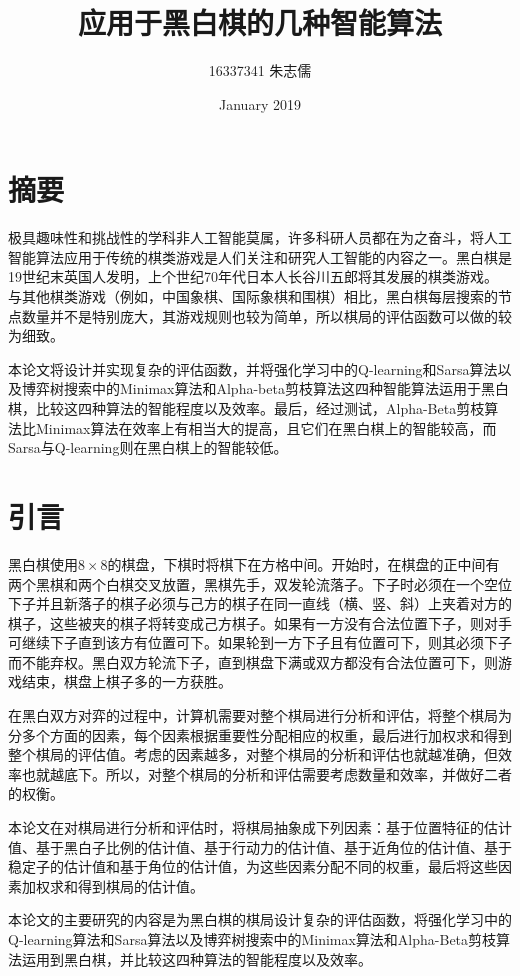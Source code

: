 \documentclass{article}
\title{应用于黑白棋的几种智能算法}
\author{16337341 朱志儒}
\date{January 2019}
\begin{document}
\maketitle

\section{摘要}
极具趣味性和挑战性的学科非人工智能莫属，许多科研人员都在为之奋斗，将人工智能算法应用于传统的棋类游戏是人们关注和研究人工智能的内容之一。黑白棋\cite{r3}是19世纪末英国人发明，上个世纪70年代日本人长谷川五郎将其发展的棋类游戏。
与其他棋类游戏（例如，中国象棋、国际象棋和围棋）相比，黑白棋每层搜索的节点数量并不是特别庞大，其游戏规则也较为简单，所以棋局的评估函数可以做的较为细致。
\par
本论文将设计并实现复杂的评估函数，并将强化学习中的Q-learning和Sarsa算法以及博弈树搜索中的Minimax算法和Alpha-beta剪枝算法这四种智能算法运用于黑白棋，比较这四种算法的智能程度以及效率。最后，经过测试，Alpha-Beta剪枝算法比Minimax算法在效率上有相当大的提高，且它们在黑白棋上的智能较高，而Sarsa与Q-learning则在黑白棋上的智能较低。

\section{引言}
黑白棋\cite{r3}使用{$8\times8$}的棋盘，下棋时将棋下在方格中间。开始时，在棋盘的正中间有两个黑棋和两个白棋交叉放置，黑棋先手，双发轮流落子。下子时必须在一个空位下子并且新落子的棋子必须与己方的棋子在同一直线（横、竖、斜）上夹着对方的棋子，这些被夹的棋子将转变成己方棋子。如果有一方没有合法位置下子，则对手可继续下子直到该方有位置可下。如果轮到一方下子且有位置可下，则其必须下子而不能弃权。黑白双方轮流下子，直到棋盘下满或双方都没有合法位置可下，则游戏结束，棋盘上棋子多的一方获胜。
\par
在黑白双方对弈的过程中，计算机需要对整个棋局进行分析和评估，将整个棋局为分多个方面的因素，每个因素根据重要性分配相应的权重，最后进行加权求和得到整个棋局的评估值。考虑的因素越多，对整个棋局的分析和评估也就越准确，但效率也就越底下。所以，对整个棋局的分析和评估需要考虑数量和效率，并做好二者的权衡。
\par
本论文在对棋局进行分析和评估时，将棋局抽象成下列因素：基于位置特征的估计值、基于黑白子比例的估计值、基于行动力的估计值、基于近角位的估计值、基于稳定子的估计值和基于角位的估计值，为这些因素分配不同的权重，最后将这些因素加权求和得到棋局的估计值。
\par
本论文的主要研究的内容是为黑白棋的棋局设计复杂的评估函数，将强化学习中的Q-learning算法和Sarsa算法以及博弈树搜索中的Minimax算法和Alpha-Beta剪枝算法运用到黑白棋，并比较这四种算法的智能程度以及效率。
\par
\end{document}
